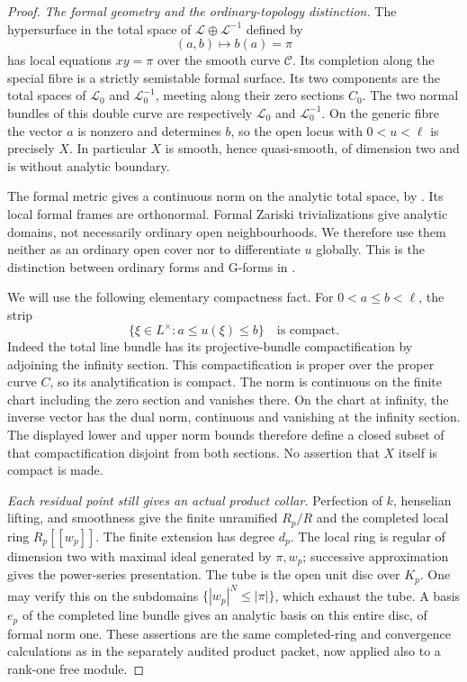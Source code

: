 \begin{proof}
\emph{The formal geometry and the ordinary-topology distinction.}
The hypersurface in the total space of
\(\mathcal L\oplus\mathcal L^{-1}\) defined by
\[
 (a,b)\longmapsto b(a)=\pi
\]
has local equations \(xy=\pi\) over the smooth curve
\(\mathcal C\). Its completion along the special fibre is a
strictly semistable formal surface. Its two components are
the total spaces of \(\mathcal L_0\) and \(\mathcal L_0^{-1}\),
meeting along their zero sections \(C_0\). The two normal
bundles of this double curve are respectively
\(\mathcal L_0\) and \(\mathcal L_0^{-1}\).
On the generic fibre the vector \(a\) is nonzero and determines
\(b\), so the open locus with \(0<u<\ell\) is precisely \(X\).
In particular \(X\) is smooth, hence quasi-smooth, of
dimension two and is without analytic boundary.

The formal metric gives a continuous norm on the analytic
total space, by \cite[Sections 17.1.2, 17.1.4--17.1.5 and
17.7.2, pp.~471--473 and 493]{CLD25}. Its local formal frames
are orthonormal. Formal Zariski trivializations give analytic
domains, not necessarily ordinary open neighbourhoods. We
therefore use them neither as an ordinary open cover nor to
differentiate \(u\) globally. This is the distinction between
ordinary forms and G-forms in
\cite[Proposition 15.1.1, pp.~421--422]{CLD25}.

We will use the following elementary compactness fact. For
\(0<a\leq b<\ell\), the strip
\begin{equation}
\label{eq:p213-torsor-compact-strip}
 \{\xi\in L^\times:a\leq u(\xi)\leq b\}
 \quad\text{is compact.}
\end{equation}
Indeed the total line bundle has its projective-bundle
compactification by adjoining the infinity section. This
compactification is proper over the proper curve \(C\), so
its analytification is compact. The norm is continuous on
the finite chart including the zero section and vanishes
there. On the chart at infinity, the inverse vector has the
dual norm, continuous and vanishing at the infinity section.
The displayed lower and upper norm bounds therefore define
a closed subset of that compactification disjoint from both
sections. No assertion that \(X\) itself is compact is made.

\emph{Each residual point still gives an actual product collar.}
Perfection of \(k\), henselian lifting, and smoothness give
the finite unramified \(R_p/R\) and the completed local ring
\(R_p[[w_p]]\). The finite extension has degree \(d_p\).
The local ring is regular of dimension two with maximal
ideal generated by \(\pi,w_p\); successive approximation
gives the power-series presentation. The tube is the open
unit disc over \(K_p\). One may verify this on the subdomains
\(\{|w_p|^N\leq|\pi|\}\), which exhaust the tube.
A basis \(e_p\) of the completed line bundle gives an analytic
basis on this entire disc, of formal norm one. These assertions
are the same completed-ring and convergence calculations as
in the separately audited product packet, now applied also
to a rank-one free module.


\end{proof}

